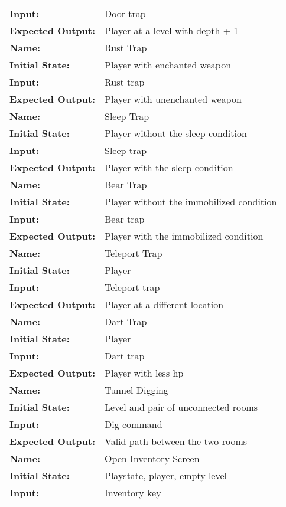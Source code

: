 \documentclass[12pt, titlepage]{article}
\begin{document}
\begin{center}
\begin{longtable}{ l | p{10cm} }
				\textbf{Input:} & Door trap\\
				\textbf{Expected Output:} & Player at a level with depth + 1\\
				\hline
				\textbf{Name:} & Rust Trap\\
				\textbf{Initial State:} & Player with enchanted weapon\\
				\textbf{Input:} & Rust trap\\
				\textbf{Expected Output:} & Player with unenchanted weapon\\
				\hline
				\textbf{Name:} & Sleep Trap\\
				\textbf{Initial State:} & Player without the sleep condition\\
				\textbf{Input:} & Sleep trap\\
				\textbf{Expected Output:} & Player with the sleep condition\\
				\hline
				\textbf{Name:} & Bear Trap\\
				\textbf{Initial State:} & Player without the immobilized condition\\
				\textbf{Input:} & Bear trap\\
				\textbf{Expected Output:} & Player with the immobilized condition\\
				\hline
				\textbf{Name:} & Teleport Trap\\
				\textbf{Initial State:} & Player\\
				\textbf{Input:} & Teleport trap\\
				\textbf{Expected Output:} & Player at a different location\\
				\hline
				\textbf{Name:} & Dart Trap\\
				\textbf{Initial State:} & Player\\
				\textbf{Input:} & Dart trap\\
				\textbf{Expected Output:} & Player with less hp\\
				\hline
				\textbf{Name:} & Tunnel Digging\\
				\textbf{Initial State:} & Level and pair of unconnected rooms\\
				\textbf{Input:} & Dig command\\
				\textbf{Expected Output:} & Valid path between the two rooms\\
				\hline
				\textbf{Name:} & Open Inventory Screen\\
				\textbf{Initial State:} & Playstate, player, empty level\\
				\textbf{Input:} & Inventory key\\

\end{longtable}
\end{center}
\end{document}
